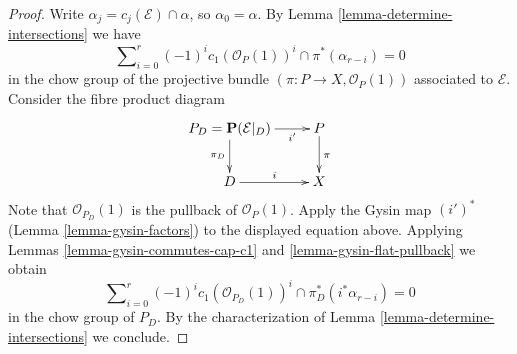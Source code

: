 \documentclass[10pt,a4paper]{amsart}
\theoremstyle{plain}
\theoremstyle{definition}
\theoremstyle{remark}
\numberwithin{equation}{subsection}
\begin{document}
\begin{proof}
Write $\alpha_j = c_j(\mathcal{E}) \cap \alpha$, so $\alpha_0 = \alpha$.
By Lemma \ref{lemma-determine-intersections} we have
$$
\sum\nolimits_{i = 0}^r
(-1)^i c_1(\mathcal{O}_P(1))^i \cap
\pi^*(\alpha_{r - i}) = 0
$$
in the chow group of the projective bundle
$(\pi : P \to X, \mathcal{O}_P(1))$
associated to $\mathcal{E}$. Consider the fibre product diagram
$$
\xymatrix{
P_D = \mathbf{P}(\mathcal{E}|_D) \ar[r]_-{i'} \ar[d]_{\pi_D} &
P \ar[d]^\pi \\
D \ar[r]^i & X
}
$$
Note that $\mathcal{O}_{P_D}(1)$ is the pullback of $\mathcal{O}_P(1)$.
Apply the Gysin map $(i')^*$ (Lemma \ref{lemma-gysin-factors}) to the
displayed equation above.
Applying Lemmas \ref{lemma-gysin-commutes-cap-c1} and
\ref{lemma-gysin-flat-pullback} we obtain
$$
\sum\nolimits_{i = 0}^r
(-1)^i c_1(\mathcal{O}_{P_D}(1))^i \cap
\pi_D^*(i^*\alpha_{r - i}) = 0
$$
in the chow group of $P_D$.
By the characterization of Lemma \ref{lemma-determine-intersections}
we conclude.
\end{proof}
\end{document}

